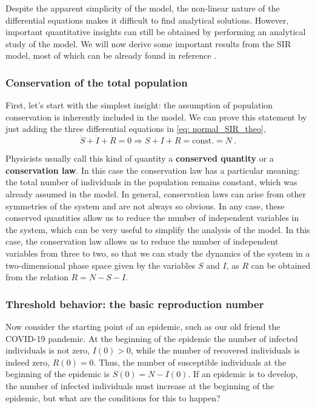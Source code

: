 Despite the apparent simplicity of the model, the non-linear nature of the
differential equations makes it difficult to find analytical solutions.
However, important quantitative insights can still be obtained by performing an
analytical study of the model. We will now derive some important results from
the SIR model, most of which can be already found in reference
\cite{Murray_book}.

\subsubsection*{Conservation of the total population}

First, let's start with the simplest insight: the assumption of population
conservation is inherently included in the model. We can prove this statement
by just adding the three differential equations in \cref{eq: normal_SIR_theo},
\begin{equation}
  \dot{S}+\dot{I}+\dot{R}=0\Longrightarrow S+I+R=\mathrm{const.}=N \ .
\end{equation}

Physicists usually call this kind of quantity a \textbf{conserved quantity}
or a \textbf{conservation law}. In this case the conservation law has a
particular meaning: the total number of individuals in the population remains
constant, which was already assumed in the model. In general, conservation laws
can arise from other symmetries of the system and are not always so obvious. In
any case, these conserved quantities allow us to reduce the number of
independent variables in the system, which can be very useful to simplify the
analysis of the model. In this case, the conservation law allows us to reduce
the number of independent variables from three to two, so that we can study the
dynamics of the system in a two-dimensional phase space given by the variables
$S$ and $I$, as $R$ can be obtained from the relation $R=N-S-I$.

\subsubsection*{Threshold behavior: the basic reproduction number}

Now consider the starting point of an epidemic, such as our old friend the
COVID-19 pandemic. At the beginning of the epidemic the number of
infected individuals is not zero, $I(0)>0$, while the number of recovered
individuals is indeed zero, $R(0)=0$. Thus, the number of susceptible
individuals at the beginning of the epidemic is $S(0)=N-I(0)$. If an epidemic
is to develop, the number of infected individuals must increase at the
beginning of the epidemic, but what are the conditions for this to happen?

